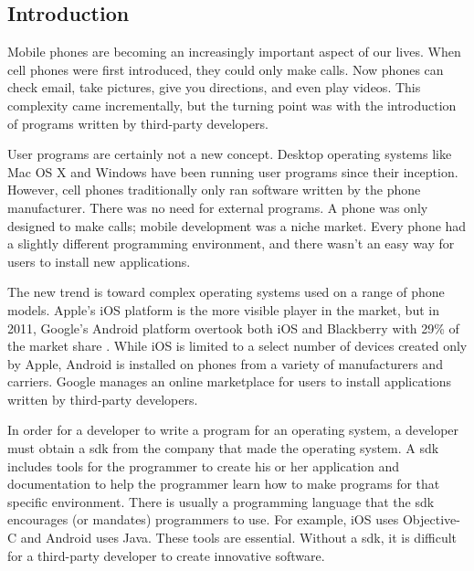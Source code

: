 \documentclass[11pt]{article}
\begin{document}
\begin{multicols}{2}
\setcounter{page}{1}

\section{Introduction} %
\label{sec:intro}

Mobile phones are becoming an increasingly important aspect of our lives.  When
cell phones were first introduced, they could only make calls.  Now phones can
check email, take pictures, give you directions, and even play videos.  This
complexity came incrementally, but the turning point was with the introduction
of programs written by third-party developers.

User programs are certainly not a new concept.  Desktop operating systems like
Mac OS X and Windows have been running user programs since their inception.
However, cell phones traditionally only ran software written by the phone
manufacturer.  There was no need for external programs.  A phone was only
designed to make calls; mobile development was a niche market.  Every phone had
a slightly different programming environment, and there wasn't an easy way for
users to install new applications.

The new trend is toward complex operating systems used on a range of phone
models.  Apple's iOS platform is the more visible player in the market, but in
2011, Google's Android platform overtook both iOS and Blackberry with 29\% of
the market share \cite{android-market-share}.  While iOS is limited to a select
number of devices created only by Apple, Android is installed on phones from a
variety of manufacturers and carriers.  Google manages an online marketplace for
users to install applications written by third-party developers.

In order for a developer to write a program for an operating system, a developer
must obtain a \gls{sdk} from the company that made the operating system.  A
\gls{sdk} includes tools for the programmer to create his or her application and
documentation to help the programmer learn how to make programs for that
specific environment.  There is usually a programming language that the
\gls{sdk} encourages (or mandates) programmers to use.  For example, iOS uses
Objective-C and Android uses Java.  These tools are essential.  Without a
\gls{sdk}, it is difficult for a third-party developer to create innovative
software.


\end{multicols}
\end{document}
